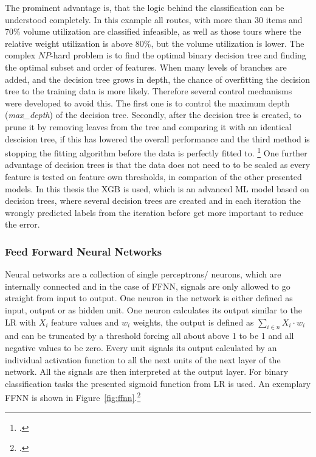 
The  prominent advantage is, that the logic behind the classification can be understood
completely. In this example all routes, with more than 30 items and $70\%$ volume utilization are classified infeasible,
as well as those tours where the relative weight utilization is above $80\%$, but the volume utilization is lower. The complex
$NP$-hard problem is to find the optimal binary decision tree and finding the optimal subset and order of
features.
When many levels of branches are added, and the decision tree grows in depth, the chance of
overfitting the decision tree to the training data is more likely. Therefore several control mechanisms
were developed to avoid this. The first one is to control the maximum depth (\textit{max\_depth})
of the decision tree. Secondly, after the decision tree is created, to prune it by removing leaves from
the tree and comparing it with an identical descision tree, if this has lowered the overall performance
and the third method is stopping the fitting algorithm before the data is perfectly fitted to. \footcite[cf.][p.252]{kotsiantis_supervised_2007}
One further advantage of decision trees is that the data does not need to to be scaled as every feature is
tested on feature own thresholds, in comparion of the other presented models. In this thesis the \gls{XGB} is used,
which is an advanced \gls{ML} model based on decision trees, where several decision trees are created and in each iteration
the wrongly predicted labels from the iteration before get more important to reduce the error.

\subsubsection{Feed Forward Neural Networks}

Neural networks are a collection of single perceptrons/ neurons, which are internally connected and
in the case of \gls{FFNN}, signals are only allowed to go straight from input to output. One neuron
in the network is either defined as input, output or as hidden unit. One neuron calculates its
output similar to the \gls{LR} with $X_i$ feature values and $w_i$ weights, the output is defined
as $\sum_{i \in n} X_i \cdot w_i$ and can be truncated by a threshold forcing all about above 1
to be 1 and all negative values to be zero. Every unit signals its output calculated by an individual
activation function to all the next units of the next layer of the network. All the signals are
then interpreted at the output layer. For binary classification tasks the presented sigmoid function from \gls{LR} is used.
An exemplary \gls{FFNN} is shown in Figure~\ref{fig:ffnn}.\footcite[cf.][p.255]{kotsiantis_supervised_2007}

